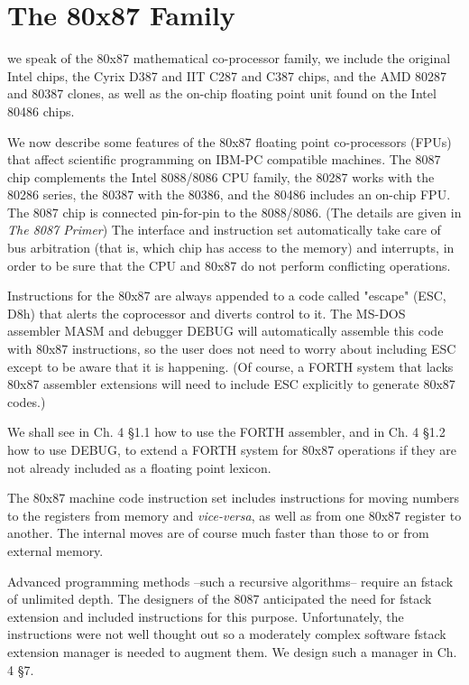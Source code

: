 
\chapter{The 80x87 Family}  

 we speak of the 80x87 mathematical co-processor family, we include the original Intel chips, the Cyrix D387 and IIT C287 and C387 chips, and the AMD 80287 and 80387 clones, as well as the on-chip floating point unit found on the Intel 80486 chips.

We now describe some features of the 80x87 floating point co-processors (FPUs) that affect scientific programming on IBM-PC compatible machines. The 8087 chip complements the Intel 8088/8086 CPU family, the 80287 works with the 80286 series, the 80387 with the 80386, and the 80486 includes an on-chip FPU. The 8087 chip is connected pin-for-pin to the 8088/8086. (The details are given in \textit{The 8087 Primer}) The interface and instruction set automatically take care of bus arbitration (that is, which chip has access to the memory) and interrupts, in order to be sure that the CPU and 80x87 do not perform conflicting operations.

Instructions for the 80x87 are always appended to a code called "escape" (ESC, D8h) that alerts the coprocessor and diverts control to it. The MS-DOS assembler MASM and debugger DEBUG will automatically assemble this code with 80x87 instructions, so the user does not need to worry about including ESC except to be aware that it is happening. (Of course, a FORTH system that lacks 80x87 assembler extensions will need to include ESC explicitly to generate 80x87 codes.)

We shall see in Ch. 4 \S1.1 how to use the FORTH assembler, and in Ch. 4 \S1.2 how to use DEBUG, to extend a FORTH system for 80x87 operations if they are not already included as a floating point lexicon.

The 80x87 machine code instruction set includes instructions for moving numbers to the registers from memory and \textit{vice-versa}, as well as from one 80x87 register to another. The internal moves are of course much faster than those to or from external memory.

Advanced programming methods --such a recursive algorithms-- require an fstack of unlimited depth. The designers of the 8087 anticipated the need for fstack extension and included instructions for this purpose. Unfortunately, the instructions were not well thought out so a moderately complex software fstack extension manager is needed to augment them. We design such a manager in Ch. 4 \S7.

